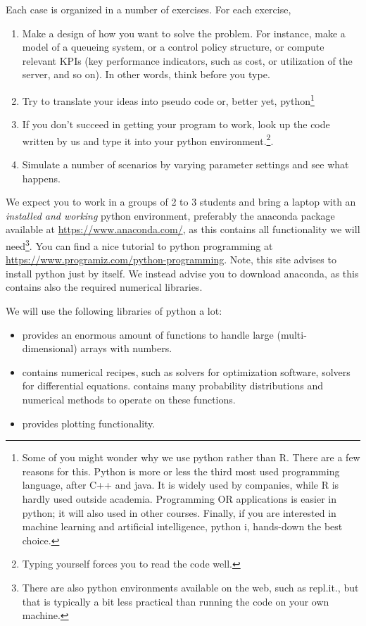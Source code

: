 \documentclass{scrartcl}
\begin{document}
Each case is organized in a number of exercises.
For each exercise,
\begin{enumerate}
\item Make a design of how you want to solve the problem.
  For instance, make a model of a queueing system, or a control policy structure, or compute relevant KPIs (key performance indicators, such as cost, or utilization of the server, and so on).
  In other words, think before you type.
\item Try to translate your ideas into pseudo code or, better yet, python\footnote{Some of you might wonder why we use python rather than R.
    There are a few reasons for this.
    Python is more or less the third most used programming language, after C++ and java.
    It is widely used by companies, while R is hardly used outside academia.
    Programming OR applications is easier in python; it will also used in other courses.
    Finally, if you are interested in machine learning and artificial intelligence, python i, hands-down the best choice.}
  \item If you don't succeed in getting your program to work,  look up the code written by us and type it into your python environment.\footnote{Typing yourself forces you to read the code well.}.
  \item Simulate a number of scenarios by varying parameter settings and see what happens.
\end{enumerate}

We expect you to work in a groups of 2 to 3 students and bring a laptop with an \emph{installed and working} python environment, preferably  the anaconda package available at \url{https://www.anaconda.com/},  as this contains all functionality we will need\footnote{There are also python environments available on the web, such as repl.it., but that is typically a bit less practical than running the code on your own machine.}. You can find a nice tutorial to python programming at  \url{https://www.programiz.com/python-programming}. Note, this site advises to install python just by itself. We instead advise you to download anaconda, as this contains also the required numerical libraries. 

We will use the following libraries of python a lot:
\begin{itemize}
\item {}  provides an enormous amount of functions to handle large (multi-dimensional) arrays with numbers. 
\item {} contains numerical recipes, such as solvers for optimization software, solvers for differential equations.  contains many probability distributions and numerical methods to operate on these functions. 
\item {} provides plotting functionality.
\end{itemize}
\end{document}
